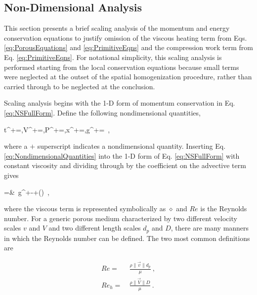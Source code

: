 \subsection{Non-Dimensional Analysis}
\label{sec:NonDim}

This section presents a brief scaling analysis of the momentum and energy conservation equations to justify omission of the viscous heating term from Eqs. \eqref{eq:PorousEquations} and \eqref{eq:PrimitiveEqns} and the compression work term from Eq. \eqref{eq:PrimitiveEqns}. For notational simplicity, this scaling analysis is performed starting from the local conservation equations because small terms were neglected at the outset of the spatial homogenization procedure, rather than carried through to be neglected at the conclusion.

Scaling analysis begins with the 1-D form of momentum conservation in Eq. \eqref{eq:NSFullForm}. Define the following nondimensional quantities,

\beq
\label{eq:NondimensionalQuantities}
t^+=,\quad V^+=,\quad P^+=,\quad x^+=,\quad g^+=\ ,
\eeq

\noindent where a \(+\) superscript indicates a nondimensional quantity. Inserting Eq. \eqref{eq:NondimensionalQuantities} into the 1-D form of Eq. \eqref{eq:NSFullForm} with constant viscosity and dividing through by the coefficient on the advective term gives

\beqa
\label{eq:NondimensionalNS2}
=&\ g^+-+\left(\diamond\right)\ ,
\eeqa

\noindent where the viscous term is represented symbolically as \(\diamond\) and \(Re\) is the Reynolds number. For a generic porous medium characterized by two different velocity scales \(v\) and \(V\) and two different length scales \(d_p\) and \(D\), there are many manners in which the Reynolds number can be defined. The two most common definitions are

\begin{subequations}
\label{eq:RePorousGeneral}
\begin{align}
\label{eq:RePorousGeneralA}
Re=&\ \frac{\rho \|\vec{v}\|d_p}{\mu}\ ,\\
\label{eq:RePorousGeneralB}
Re_h=&\ \frac{\rho \|\vec{V}\|D}{\mu}\ .
\end{align}
\end{subequations}

